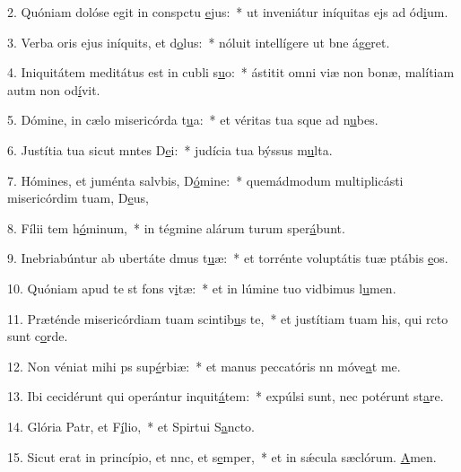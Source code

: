 2. Quóniam dolóse egit in conspctu \uline{e}jus:~* ut inveniátur iníquitas ejs ad ód\uline{i}um.\par 
3. Verba oris ejus iníquits, et d\uline{o}lus:~* nóluit intellígere ut bne ág\uline{e}ret.\par 
4. Iniquitátem meditátus est in cubli s\uline{u}o:~* ástitit omni viæ non bonæ, malítiam autm non od\uline{í}vit.\par 
5. Dómine, in cælo misericórda t\uline{u}a:~* et véritas tua sque ad n\uline{u}bes.\par 
6. Justítia tua sicut mntes D\uline{e}i:~* judícia tua býssus m\uline{u}lta.\par 
7. Hómines, et juménta salvbis, D\uline{ó}mine:~* quemádmodum multiplicásti misericórdim tuam, D\uline{e}us,\par 
8. Fílii tem h\uline{ó}minum,~* in tégmine alárum turum sper\uline{á}bunt.\par 
9. Inebriabúntur ab ubertáte dmus t\uline{u}æ:~* et torrénte voluptátis tuæ ptábis \uline{e}os.\par 
10. Quóniam apud te st fons v\uline{i}tæ:~* et in lúmine tuo vidbimus l\uline{u}men.\par 
11. Præténde misericórdiam tuam scintib\uline{u}s te,~* et justítiam tuam his, qui rcto sunt c\uline{o}rde.\par 
12. Non véniat mihi ps sup\uline{é}rbiæ:~* et manus peccatóris nn móve\uline{a}t me.\par 
13. Ibi cecidérunt qui operántur inquit\uline{á}tem:~* expúlsi sunt, nec potérunt st\uline{a}re.\par 
14. Glória Patr, et F\uline{í}lio,~* et Spirtui S\uline{a}ncto.\par 
15. Sicut erat in princípio, et nnc, et s\uline{e}mper,~* et in sǽcula sæclórum. \uline{A}men.\par 

